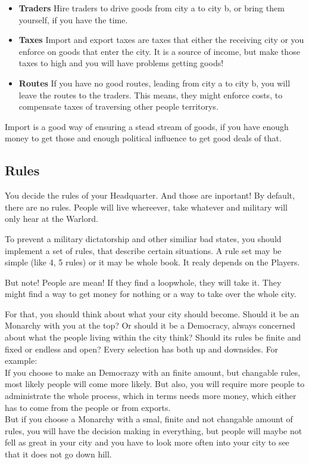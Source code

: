 \documentclass[10pt,twoside,twocolumn,openany]{book}
\begin{document}
\begin{itemize}
\item \textbf{Traders} Hire traders to drive goods from city a to city b, or bring them yourself, if you have the time.
\item \textbf{Taxes} Import and export taxes are taxes that either the receiving city or you enforce on goods that enter the city. It is a source of income, but make those taxes to high and you will have problems getting goods!
\item \textbf{Routes} If you have no good routes, leading from city a to city b, you will leave the routes to the traders. This means, they might enforce costs, to compensate taxes of traversing other people territorys.
\end{itemize}

Import is a good way of ensuring a stead stream of goods, if you have enough money to get those and enough political influence to get good deals of that.

\subsection{Rules}

You decide the rules of your Headquarter. And those are inportant! By default, there are no rules. People will live whereever, take whatever and military will only hear at the Warlord.

To prevent a military dictatorship and other similiar bad states, you should implement a set of rules, that describe certain situations. A rule set may be simple (like 4, 5 rules) or it may be whole book. It realy depends on the Players.

But note! People are mean! If they find a loopwhole, they will take it. They might find a way to get money for nothing or a way to take over the whole city.

For that, you should think about what your city should become. Should it be an Monarchy with you at the top? Or should it be a Democracy, always concerned about what the people living within the city think? Should its rules be finite and fixed or endless and open? Every selection has both up and downsides. For example:\\
If you choose to make an Democrazy with an finite amount, but changable rules, most likely people will come more likely. But also, you will require more people to administrate the whole process, which in terms needs more money, which either has to come from the people or from exports.\\
But if you choose a Monarchy with a smal, finite and not changable amount of rules, you will have the decision making in everything, but people will maybe not fell as great in your city and you have to look more often into your city to see that it does not go down hill.\\
\end{document}
